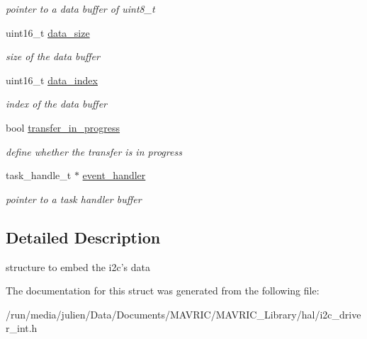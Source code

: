 \begin{DoxyCompactItemize}
\begin{DoxyCompactList}\small\item\em pointer to a data buffer of uint8\+\_\+t \end{DoxyCompactList}\item 
\hypertarget{structi2c__packet__t_a105f18d0dc463f84a8c0917cd76c6408}{uint16\+\_\+t \hyperlink{structi2c__packet__t_a105f18d0dc463f84a8c0917cd76c6408}{data\+\_\+size}}\label{structi2c__packet__t_a105f18d0dc463f84a8c0917cd76c6408}

\begin{DoxyCompactList}\small\item\em size of the data buffer \end{DoxyCompactList}\item 
\hypertarget{structi2c__packet__t_a656c8c60164747f671babdfa005ec135}{uint16\+\_\+t \hyperlink{structi2c__packet__t_a656c8c60164747f671babdfa005ec135}{data\+\_\+index}}\label{structi2c__packet__t_a656c8c60164747f671babdfa005ec135}

\begin{DoxyCompactList}\small\item\em index of the data buffer \end{DoxyCompactList}\item 
\hypertarget{structi2c__packet__t_a17b3a6f03d2cbcb701e240c24de48e39}{bool \hyperlink{structi2c__packet__t_a17b3a6f03d2cbcb701e240c24de48e39}{transfer\+\_\+in\+\_\+progress}}\label{structi2c__packet__t_a17b3a6f03d2cbcb701e240c24de48e39}

\begin{DoxyCompactList}\small\item\em define whether the transfer is in progress \end{DoxyCompactList}\item 
\hypertarget{structi2c__packet__t_ac83d77f8203bf7ec16e87a036165619b}{task\+\_\+handle\+\_\+t $\ast$ \hyperlink{structi2c__packet__t_ac83d77f8203bf7ec16e87a036165619b}{event\+\_\+handler}}\label{structi2c__packet__t_ac83d77f8203bf7ec16e87a036165619b}

\begin{DoxyCompactList}\small\item\em pointer to a task handler buffer \end{DoxyCompactList}\end{DoxyCompactItemize}


\subsection{Detailed Description}
structure to embed the i2c's data 

The documentation for this struct was generated from the following file\+:\begin{DoxyCompactItemize}
\item 
/run/media/julien/\+Data/\+Documents/\+M\+A\+V\+R\+I\+C/\+M\+A\+V\+R\+I\+C\+\_\+\+Library/hal/i2c\+\_\+driver\+\_\+int.\+h\end{DoxyCompactItemize}
